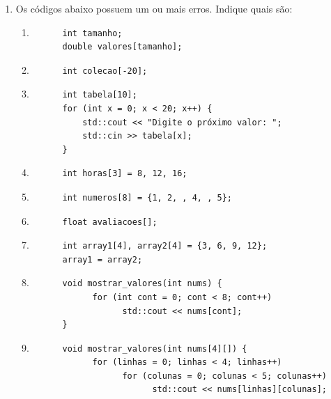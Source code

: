 \documentclass[12pt]{article}
\begin{document}
\begin{enumerate}
      \item Os códigos abaixo possuem um ou mais erros. Indique quais são:
            \begin{enumerate}
                  \item \begin{verbatim}
      int tamanho;
      double valores[tamanho];
                  \end{verbatim}
                  \item \begin{verbatim}
      int colecao[-20];
                  \end{verbatim}
                  \item \begin{verbatim}
      int tabela[10];
      for (int x = 0; x < 20; x++) {
          std::cout << "Digite o próximo valor: ";
          std::cin >> tabela[x];
      }
                  \end{verbatim}
                  \item \begin{verbatim}
      int horas[3] = 8, 12, 16;
                  \end{verbatim}
                  \item \begin{verbatim}
      int numeros[8] = {1, 2, , 4, , 5};
                  \end{verbatim}
                  \item \begin{verbatim}
      float avaliacoes[];
                  \end{verbatim}
                  \item \begin{verbatim}
      int array1[4], array2[4] = {3, 6, 9, 12};
      array1 = array2;
                  \end{verbatim}
                  \item \begin{verbatim}
      void mostrar_valores(int nums) { 
            for (int cont = 0; cont < 8; cont++) 
                  std::cout << nums[cont]; 
      }
                  \end{verbatim}
                  \item \begin{verbatim}
      void mostrar_valores(int nums[4][]) {
            for (linhas = 0; linhas < 4; linhas++) 
                  for (colunas = 0; colunas < 5; colunas++) 
                        std::cout << nums[linhas][colunas]; 

\end{verbatim}
\end{enumerate}
\end{enumerate}
\end{document}
